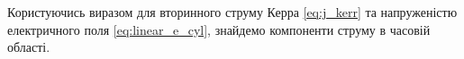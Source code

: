 %
%

Користуючись виразом для вторинного струму Керра \eqref{eq:j_kerr} та 
напруженістю електричного поля \eqref{eq:linear_e_cyl}, знайдемо 
компоненти струму в часовій області. 

